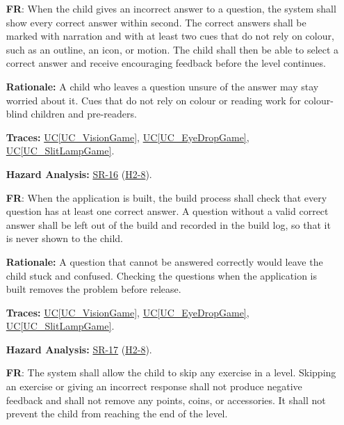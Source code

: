 \documentclass[12pt]{article}
\newcommand{\ucref}[1]{\hyperref[#1]{UC\ref*{#1}}}
\newcounter{reqnum} %
\newcommand{\haurl}{https://team-hindsight.github.io/ophthamology-game/HazardAnalysis/HazardAnalysis.pdf}
\newcommand{\hasrref}[2]{\href{\haurl\#nameddest=sr:#1}{SR-#2}}
\newcommand{\hahazref}[2]{\href{\haurl\#nameddest=haz:#1}{H#2}}
\newcommand{\hazsr}[4]{\hasrref{#1}{#2} (\hahazref{#3}{#4})}
\newcommand{\constref}[1]{%
    \hyperref[const:#1]{\texttt{\detokenize{#1}}}%
}
\begin{document}
\begin{itemize}
\textbf{Rationale:} Turning the sound down must not cut the child off from the preparation
content. Deaf children and children in a quiet waiting room also need to be
able to play without sound.

\textbf{Traces:} \ucref{UC_VisionGame}, \ucref{UC_EyeDropGame},
\ucref{UC_SlitLampGame}.

\textbf{Hazard Analysis:} \hazsr{SafeAudioVisuals}{14}{UnsafeAudioVisuals}{2-14}, \hazsr{NarrationMuted}{18}{NarrationDisabledSetting}{2-12}.

\item[\refstepcounter{reqnum}\textbf{FR\thereqnum}\label{FR_RevealAnswer}:]
When the child gives an incorrect answer to a question, the system shall
show every correct answer within \constref{ANSWER_REVEAL_MAX_S} second. The
correct answers shall be marked with narration and with at least two cues that
do not rely on colour, such as an outline, an icon, or motion. The child shall
then be able to select a correct answer and receive encouraging feedback
before the level continues.

\textbf{Rationale:} A child who leaves a question unsure of the answer may stay worried about
it. Cues that do not rely on colour or reading work for colour-blind children
and pre-readers.

\textbf{Traces:} \ucref{UC_VisionGame}, \ucref{UC_EyeDropGame},
\ucref{UC_SlitLampGame}.

\textbf{Hazard Analysis:} \hazsr{CorrectAnswerReveal}{16}{CorrectAnswerReveal}{2-8}.

\item[\refstepcounter{reqnum}\textbf{FR\thereqnum}\label{FR_ValidQuestions}:]
When the application is built, the build process shall check that every
question has at least one correct answer. A question without a valid correct
answer shall be left out of the build and recorded in the build log, so that
it is never shown to the child.

\textbf{Rationale:} A question that cannot be answered correctly would leave the child stuck
and confused. Checking the questions when the application is built removes
the problem before release.

\textbf{Traces:} \ucref{UC_VisionGame}, \ucref{UC_EyeDropGame},
\ucref{UC_SlitLampGame}.

\textbf{Hazard Analysis:} \hazsr{AtLeastOneCorrectAnswer}{17}{CorrectAnswerReveal}{2-8}.

\item[\refstepcounter{reqnum}\textbf{FR\thereqnum}\label{FR_NoPenalty}:]
The system shall allow the child to skip any exercise in a level.
Skipping an exercise or giving an incorrect response shall not produce
negative feedback and shall not remove any points, coins, or accessories. It
shall not prevent the child from reaching the end of the level.


\end{itemize}
\end{document}
